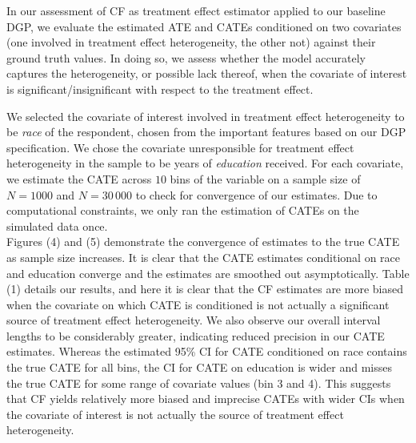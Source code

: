 \documentclass[12pt]{article}
\begin{document}
In our assessment of CF as treatment effect estimator applied to our baseline
DGP, we evaluate the estimated ATE and CATEs conditioned on two covariates (one
involved in treatment effect heterogeneity, the other not) against their ground
truth values. In doing so, we assess whether the model accurately captures the
heterogeneity, or possible lack thereof, when the covariate of interest is
significant/insignificant with respect to the treatment effect. 

We selected the covariate of interest involved in treatment effect heterogeneity
to be \textit{race} of the respondent, chosen from the important features based
on our DGP specification. We chose the covariate unresponsible for treatment
effect heterogeneity in the sample to be years of \textit{education} received.
For each covariate, we estimate the CATE across $10$ bins of the variable on a
sample size of $N = 1000$ and $N = 30\,000$ to check for convergence of our
estimates. Due to computational constraints, we only ran the estimation of CATEs
on the simulated data once. \\ 

Figures (4) and (5) demonstrate the convergence of estimates to the true CATE as
sample size increases. It is clear that the CATE estimates conditional on race
and education converge and the estimates are smoothed out asymptotically. Table
(1) details our results, and here it is clear that the CF estimates are more
biased when the covariate on which CATE is conditioned is not actually a
significant source of treatment effect heterogeneity. We also observe our
overall interval lengths to be considerably greater, indicating reduced
precision in our CATE estimates. Whereas the estimated 95\% CI for CATE
conditioned on race contains the true CATE for all bins, the CI for CATE on
education is wider and misses the true CATE for some range of covariate values
(bin 3 and 4). This suggests that CF yields relatively more biased and imprecise
CATEs with wider CIs when the covariate of interest is not actually the source
of treatment effect heterogeneity. \\ 
\end{document}
